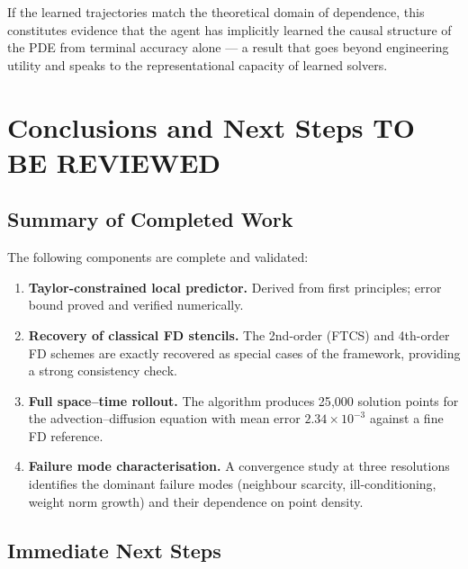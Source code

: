 \documentclass[12pt, a4paper, twoside]{report}
\theoremstyle{plain}
\theoremstyle{definition}
\begin{document}
If the learned trajectories match the theoretical domain of dependence, this constitutes
evidence that the agent has implicitly learned the causal structure of the PDE from
terminal accuracy alone --- a result that goes beyond engineering utility and speaks to
the representational capacity of learned solvers.
 
\chapter{Conclusions and Next Steps  \textcolor{r ed}{TO BE REVIEWED}}
\label{chap:conclusions}

\section{Summary of Completed Work}
\label{sec:summary}

The following components are complete and validated:

\begin{enumerate}
    \item \textbf{Taylor-constrained local predictor.}
    Derived from first principles; error bound proved and verified
    numerically.

    \item \textbf{Recovery of classical FD stencils.}
    The 2nd-order (FTCS) and 4th-order FD schemes are exactly
    recovered as special cases of the framework, providing a
    strong consistency check.

    \item \textbf{Full space--time rollout.}
    The algorithm produces 25{,}000 solution points for the
    advection--diffusion equation with mean error
    $2.34 \times 10^{-3}$ against a fine FD reference.

    \item \textbf{Failure mode characterisation.}
    A convergence study at three resolutions identifies the
    dominant failure modes (neighbour scarcity, ill-conditioning,
    weight norm growth) and their dependence on point density.
\end{enumerate}

\section{Immediate Next Steps}
\label{sec:next_steps}
\end{document}

